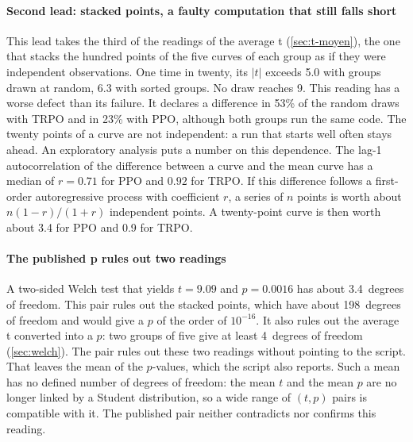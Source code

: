 \paragraph{Second lead: stacked points, a faulty computation that still falls short}
This lead takes the third of the readings of the average t (\cref{sec:t-moyen}), the one that stacks the
hundred points of the five curves of each group as if they were independent observations. One time in twenty, its $|t|$ exceeds 5.0 with groups drawn at random, 6.3 with sorted groups.
No draw reaches 9. This reading has a worse defect than its failure. It declares a difference in 53\% of the
random draws with TRPO and in 23\% with PPO, although both groups run the same code. The twenty points of a
curve are not independent: a run that starts well often stays ahead. An exploratory analysis puts a number on this dependence. The lag-1 autocorrelation of the difference between a curve and
the mean curve has a median of $r = 0.71$ for PPO and $0.92$ for TRPO. If this difference follows a first-order
autoregressive process with coefficient $r$, a series of $n$ points is worth about $n(1-r)/(1+r)$ independent
points. A twenty-point curve is then worth about 3.4 for PPO and 0.9 for TRPO.

\paragraph{The published p rules out two readings}
A two-sided Welch test that yields $t=9.09$ and $p=0.0016$ has about 3.4~degrees of freedom. This pair rules
out the stacked points, which have about 198~degrees of freedom and would give a $p$ of the order of
$10^{-16}$. It also rules out the average t converted into a $p$: two groups of five give at least 4~degrees
of freedom (\cref{sec:welch}). The pair rules out these two readings without pointing to the script. That
leaves the mean of the $p$-values, which the script also reports. Such a mean has no defined number of degrees
of freedom: the mean $t$ and the mean $p$ are no longer linked by a Student distribution, so a wide range of
$(t, p)$ pairs is compatible with it. The published pair neither contradicts nor confirms this reading.

